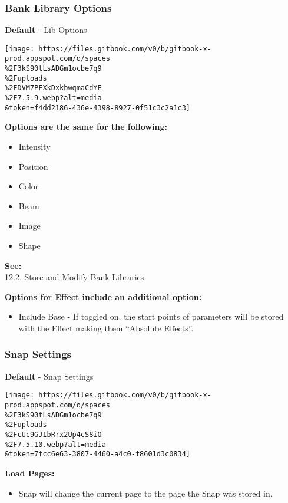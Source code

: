 \documentclass[
]{article}
\providecommand{\tightlist}{%
  \setlength{\itemsep}{0pt}\setlength{\parskip}{0pt}}
\begin{document}
\hypertarget{bank-library-options}{%
\subsubsection{Bank Library Options}\label{bank-library-options}}

\textbf{Default} - Lib Options

\texttt{[image: https://files.gitbook.com/v0/b/gitbook-x-prod.appspot.com/o/spaces\\\%2F3kS90tLsADGm1ocbe7q9\\\%2Fuploads\\\%2FDVM7PFXkDxkbwqmaCdYE\\\%2F7.5.9.webp?alt=media\\\&token=f4dd2186-436e-4398-8927-0f51c3c2a1c3]}

\textbf{Options are the same for the following:}

\begin{itemize}
\tightlist
\item
  Intensity
\item
  Position
\item
  Color
\item
  Beam
\item
  Image
\item
  Shape
\end{itemize}

\textbf{See:}\\
\href{https://vibemanual.compulite.com/libraries.html\#store-and-modify-bank-libraries}{12.2. Store and Modify Bank Libraries}

\textbf{Options for Effect include an additional option:}

\begin{itemize}
\tightlist
\item
  Include Base - If toggled on, the start points of parameters will be stored with the Effect making them ``Absolute Effects''.
\end{itemize}

\hypertarget{snap-settings}{%
\subsubsection{Snap Settings}\label{snap-settings}}

\textbf{Default} - Snap Settings

\texttt{[image: https://files.gitbook.com/v0/b/gitbook-x-prod.appspot.com/o/spaces\\\%2F3kS90tLsADGm1ocbe7q9\\\%2Fuploads\\\%2FcUc9GJIbRrx2Up4cS8iO\\\%2F7.5.10.webp?alt=media\\\&token=7fcc6e63-3807-4460-a4c0-f8601d3c0834]}

\textbf{Load Pages:}

\begin{itemize}
\tightlist
\item
  Snap will change the current page to the page the Snap was stored in.
\end{itemize}
\end{document}
